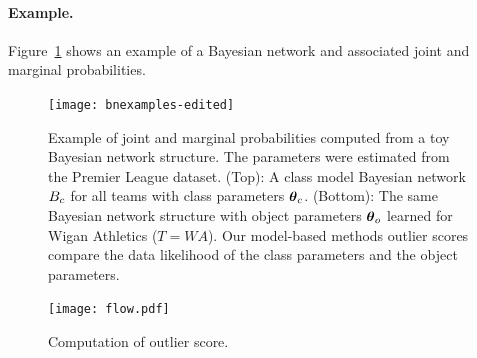 \documentclass[conference]{IEEEtran}
\begin{document}
\paragraph{Example.} Figure~\ref{fig:bns} shows an example of a Bayesian network and associated joint and marginal probabilities.
%
\begin{figure}[t]
	\centering
	\texttt{[image: bnexamples-edited]}
	\caption{Example of joint and marginal probabilities computed from a toy Bayesian network structure. The parameters were estimated from the  Premier League dataset. (Top): A class model Bayesian network $B_{c}$ for all teams with class parameters $\boldsymbol{\theta}_{c}$. (Bottom): The same Bayesian network structure with object parameters $\boldsymbol{\theta}_{o}$ learned for Wigan Athletics ($T = WA$). Our model-based methods outlier scores compare the data likelihood of the class parameters and the object parameters.
		\label{fig:bns}
		}
\end{figure}


\begin{figure}[t]
\centering
\texttt{[image: flow.pdf]}
\caption{Computation of outlier score. 
\label{fig:flow}}
\end{figure}
%				
%				
%				
%				
				
%					
%					
\end{document}
